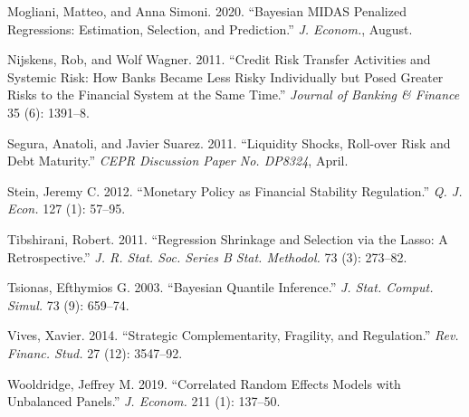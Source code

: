 \documentclass[
  10pt,
]{article}
\begin{document}
\leavevmode\hypertarget{ref-Mogliani2020}{}%
Mogliani, Matteo, and Anna Simoni. 2020. ``Bayesian MIDAS Penalized
Regressions: Estimation, Selection, and Prediction.'' \emph{J. Econom.},
August.

\leavevmode\hypertarget{ref-Nijskens2011}{}%
Nijskens, Rob, and Wolf Wagner. 2011. ``Credit Risk Transfer Activities
and Systemic Risk: How Banks Became Less Risky Individually but Posed
Greater Risks to the Financial System at the Same Time.'' \emph{Journal
of Banking \& Finance} 35 (6): 1391--8.

\leavevmode\hypertarget{ref-Segura2011}{}%
Segura, Anatoli, and Javier Suarez. 2011. ``Liquidity Shocks, Roll-over
Risk and Debt Maturity.'' \emph{CEPR Discussion Paper No. DP8324},
April.

\leavevmode\hypertarget{ref-Stein2012}{}%
Stein, Jeremy C. 2012. ``Monetary Policy as Financial Stability
Regulation.'' \emph{Q. J. Econ.} 127 (1): 57--95.

\leavevmode\hypertarget{ref-Tibshirani2011}{}%
Tibshirani, Robert. 2011. ``Regression Shrinkage and Selection via the
Lasso: A Retrospective.'' \emph{J. R. Stat. Soc. Series B Stat.
Methodol.} 73 (3): 273--82.

\leavevmode\hypertarget{ref-Tsionas2003}{}%
Tsionas, Efthymios G. 2003. ``Bayesian Quantile Inference.'' \emph{J.
Stat. Comput. Simul.} 73 (9): 659--74.

\leavevmode\hypertarget{ref-Vives2014}{}%
Vives, Xavier. 2014. ``Strategic Complementarity, Fragility, and
Regulation.'' \emph{Rev. Financ. Stud.} 27 (12): 3547--92.

\leavevmode\hypertarget{ref-Wooldridge2019}{}%
Wooldridge, Jeffrey M. 2019. ``Correlated Random Effects Models with
Unbalanced Panels.'' \emph{J. Econom.} 211 (1): 137--50.
\end{document}
